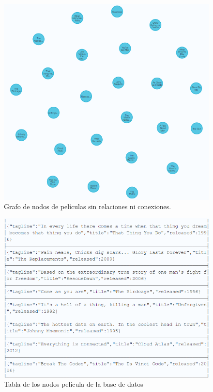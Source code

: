 \begin{figure}[H]
    \centering
    \includegraphics[scale=0.8]{Graficos/graph2.png}
    \caption{Grafo de nodos de películas sin relaciones ni conexiones.}
    \label{fig:graph_2}
\end{figure}
\begin{figure}[H]
    \centering
    \includegraphics[scale=0.7]{Graficos/tabla2.png}
    \caption{Tabla de los nodos película de la base de datos}
    \label{fig:tab_2}
\end{figure}
